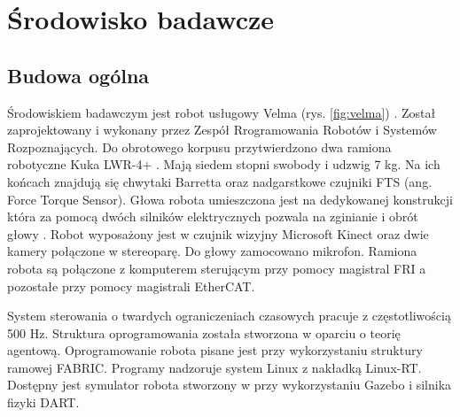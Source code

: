 
\chapter{Środowisko badawcze\label{chap:srodowisko}}
	\section{Budowa ogólna}
	Środowiskiem badawczym jest robot usługowy Velma (rys. \ref{fig:velma}) \cite{bib:velma}. Został zaprojektowany i wykonany przez Zespół Rrogramowania Robotów i Systemów Rozpoznających\cite{bib:robotyka}. Do obrotowego korpusu przytwierdzono dwa ramiona robotyczne Kuka LWR-4+\cite{bib:kukaPage} \cite{bib:kuka}. Mają siedem stopni swobody i udzwig 7 kg. Na ich końcach znajdują się chwytaki Barretta\cite{bib:barrett}  oraz nadgarstkowe czujniki FTS (ang. Force Torque Sensor). Głowa robota umieszczona jest na dedykowanej konstrukcji która za pomocą dwóch silników elektrycznych pozwala na zginianie i obrót głowy\cite{bib:velmaLeb} \cite{bib:velmaKorp}. Robot wyposażony jest w czujnik wizyjny Microsoft Kinect oraz dwie kamery połączone w stereoparę. Do głowy zamocowano mikrofon. Ramiona robota są połączone z komputerem sterującym przy pomocy magistral FRI a pozostałe przy pomocy magistrali EtherCAT. 
	
	System sterowania o twardych ograniczeniach czasowych pracuje z częstotliwością 500 Hz. Struktura oprogramowania została stworzona w oparciu o teorię agentową. Oprogramowanie robota pisane jest przy wykorzystaniu struktury ramowej FABRIC. Programy nadzoruje system Linux z nakładką Linux-RT. Dostępny jest symulator robota stworzony w przy wykorzystaniu Gazebo i silnika fizyki DART. 
	
